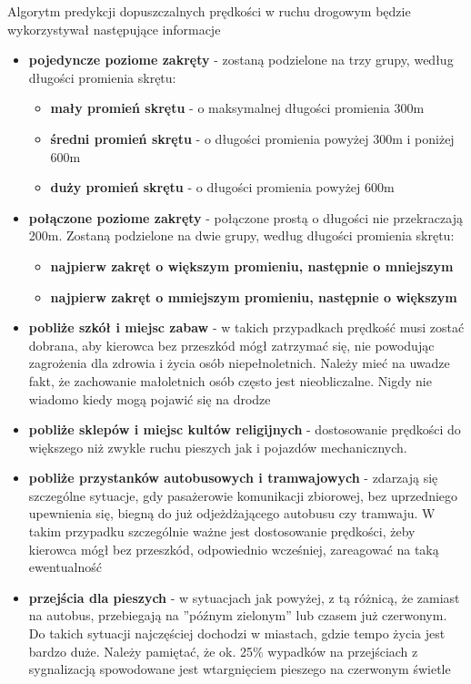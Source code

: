 Algorytm predykcji dopuszczalnych prędkości w ruchu drogowym będzie wykorzystywał następujące informacje

\begin{itemize}
\item \textbf{pojedyncze poziome zakręty} - zostaną podzielone na trzy grupy, według długości promienia skrętu:
 \begin{itemize}
 	\item \textbf{mały promień skrętu} - o maksymalnej długości promienia 300m
 	\item \textbf{średni promień skrętu} - o długości promienia powyżej 300m i poniżej 600m
 	\item \textbf{duży promień skrętu} - o długości promienia powyżej 600m
 \end{itemize}
\item \textbf{połączone poziome zakręty} - połączone prostą o długości nie przekraczają 200m. Zostaną podzielone na dwie grupy, według długości promienia skrętu:
 \begin{itemize}
 	\item \textbf{najpierw zakręt o większym promieniu, następnie o mniejszym}
 	\item \textbf{najpierw zakręt o mmiejszym promieniu, następnie o większym}
 \end{itemize}
\item \textbf{pobliże szkół i miejsc zabaw} - w takich przypadkach prędkość musi zostać dobrana, aby kierowca bez przeszkód mógł zatrzymać się, nie powodując zagrożenia dla zdrowia i życia osób niepełnoletnich. Należy mieć na uwadze fakt, że zachowanie małoletnich osób często jest nieobliczalne. Nigdy nie wiadomo kiedy mogą pojawić się na drodze
\item \textbf{pobliże sklepów i miejsc kultów religijnych} - dostosowanie prędkości do większego niż zwykle ruchu pieszych jak i pojazdów mechanicznych.
\item \textbf{pobliże przystanków autobusowych i tramwajowych} - zdarzają się szczególne sytuacje, gdy pasażerowie komunikacji zbiorowej, bez uprzedniego upewnienia się, biegną  do już odjeżdżającego autobusu czy tramwaju. W takim przypadku szczególnie ważne jest dostosowanie prędkości, żeby kierowca mógł bez przeszkód, odpowiednio wcześniej, zareagować na taką ewentualność
\newpage
\item \textbf{przejścia dla pieszych} - w sytuacjach jak powyżej, z tą różnicą, że zamiast na autobus, przebiegają na ''późnym zielonym'' lub czasem już czerwonym. Do takich sytuacji najczęściej dochodzi w miastach, gdzie tempo życia jest bardzo duże. Należy pamiętać, że ok. 25\% wypadków na przejściach z sygnalizacją spowodowane jest wtargnięciem pieszego na czerwonym świetle

\end{itemize}
